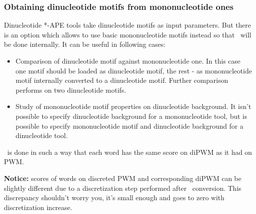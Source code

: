 \subsubsection{Obtaining dinucleotide motifs from mononucleotide ones}
Dinucleotide *-APE tools take dinucleotide motifs as input parameters. But there is an option  which allows to use basic mononucleotide motifs instead so that \PwmToDiPwm\ will be done internally. It can be useful in following cases:
\begin{itemize}
\item Comparison of dinucleotide motif against mononucleotide one. In this case one motif should be loaded as dinucleotide motif, the rest - as mononucleotide motif internally converted to a dinucleotide motif. Further comparison performs on two dinucleotide motifs.
\item Study of mononucleotide motif properties on dinucleotide background. It isn't possible to specify dinucleotide background for a mononucleotide tool, but is possible to specify mononucleotide motif and dinucleotide background for a dinucleotide tool. 
\end{itemize}

\PwmToDiPwm\ is done in such a way that each word has the same score on diPWM as it had on PWM.

{\small\textbf{Notice:} scores of words on discreted PWM and corresponding diPWM can be slightly different due to a discretization step performed after \PwmToDiPwm\ conversion. This discrepancy shouldn't worry you, it's small enough and goes to zero with discretization increase.}
